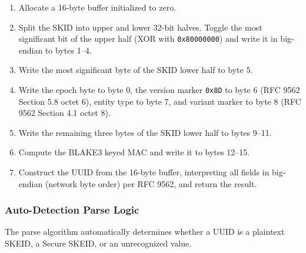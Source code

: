 \documentclass[fleqn,10pt]{wlpeerj}
\providecommand{\tightlist}{%
  \setlength{\itemsep}{0pt}\setlength{\parskip}{0pt}}
\begin{document}
\begin{enumerate}
\def\labelenumi{\arabic{enumi}.}
\tightlist
\item
  Allocate a 16-byte buffer initialized to zero.
\item
  Split the SKID into upper and lower 32-bit halves. Toggle the most
  significant bit of the upper half (XOR with \texttt{0x80000000}) and
  write it in big-endian to bytes 1--4.
\item
  Write the most significant byte of the SKID lower half to byte 5.
\item
  Write the epoch byte to byte 0, the version marker \texttt{0x8D} to
  byte 6 (RFC 9562 Section 5.8 octet 6), entity type to byte 7, and
  variant marker to byte 8 (RFC 9562 Section 4.1 octet 8).
\item
  Write the remaining three bytes of the SKID lower half to bytes 9--11.
\item
  Compute the BLAKE3 keyed MAC and write it to bytes 12--15.
\item
  Construct the UUID from the 16-byte buffer, interpreting all fields in
  big-endian (network byte order) per RFC 9562, and return the result.
\end{enumerate}

\subsubsection{Auto-Detection Parse
Logic}\label{auto-detection-parse-logic}

The parse algorithm automatically determines whether a UUID is a
plaintext SKEID, a Secure SKEID, or an unrecognized value.
\end{document}
